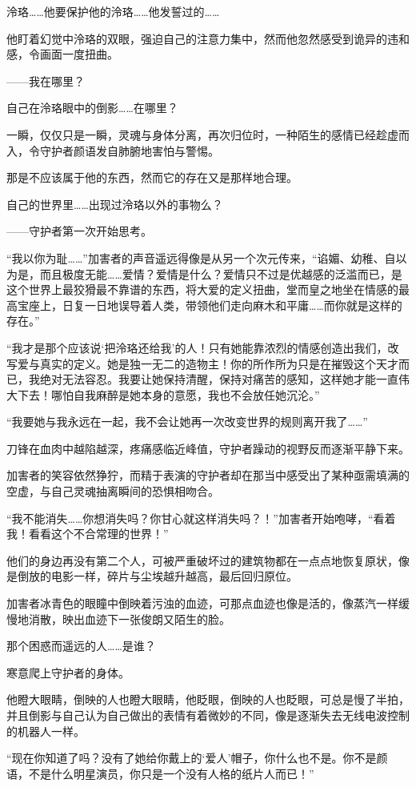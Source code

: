\documentclass[UTF8, scheme = chinese, openany]{ctexbook}
\begin{document}
泠珞……他要保护他的泠珞……他发誓过的……

他盯着幻觉中泠珞的双眼，强迫自己的注意力集中，然而他忽然感受到诡异的违和感，令画面一度扭曲。

——我在哪里？

自己在泠珞眼中的倒影……在哪里？

一瞬，仅仅只是一瞬，灵魂与身体分离，再次归位时，一种陌生的感情已经趁虚而入，令守护者颜语发自肺腑地害怕与警惕。

那是不应该属于他的东西，然而它的存在又是那样地合理。

自己的世界里……出现过泠珞以外的事物么？

——守护者第一次开始思考。

“我以你为耻……”加害者的声音遥远得像是从另一个次元传来，“谄媚、幼稚、自以为是，而且极度无能……爱情？爱情是什么？爱情只不过是优越感的泛滥而已，是这个世界上最狡猾最不靠谱的东西，将大爱的定义扭曲，堂而皇之地坐在情感的最高宝座上，日复一日地误导着人类，带领他们走向麻木和平庸……而你就是这样的存在。”

“我才是那个应该说‘把泠珞还给我’的人！只有她能靠浓烈的情感创造出我们，改写爱与真实的定义。她是独一无二的造物主！你的所作所为只是在摧毁这个天才而已，我绝对无法容忍。我要让她保持清醒，保持对痛苦的感知，这样她才能一直伟大下去！哪怕自我麻醉是她本身的意愿，我也不会放任她沉沦。”

“我要她与我永远在一起，我不会让她再一次改变世界的规则离开我了……”

刀锋在血肉中越陷越深，疼痛感临近峰值，守护者躁动的视野反而逐渐平静下来。

加害者的笑容依然狰狞，而精于表演的守护者却在那当中感受出了某种亟需填满的空虚，与自己灵魂抽离瞬间的恐惧相吻合。

“我不能消失……你想消失吗？你甘心就这样消失吗？！”加害者开始咆哮，“看着我！看看这个不合常理的世界！”

他们的身边再没有第二个人，可被严重破坏过的建筑物都在一点点地恢复原状，像是倒放的电影一样，碎片与尘埃越升越高，最后回归原位。

加害者冰青色的眼瞳中倒映着污浊的血迹，可那点血迹也像是活的，像蒸汽一样缓慢地消散，映出血迹下一张俊朗又陌生的脸。

那个困惑而遥远的人……是谁？

寒意爬上守护者的身体。

他瞪大眼睛，倒映的人也瞪大眼睛，他眨眼，倒映的人也眨眼，可总是慢了半拍，并且倒影与自己认为自己做出的表情有着微妙的不同，像是逐渐失去无线电波控制的机器人一样。

“现在你知道了吗？没有了她给你戴上的‘爱人’帽子，你什么也不是。你不是颜语，不是什么明星演员，你只是一个没有人格的纸片人而已！”
\end{document}
